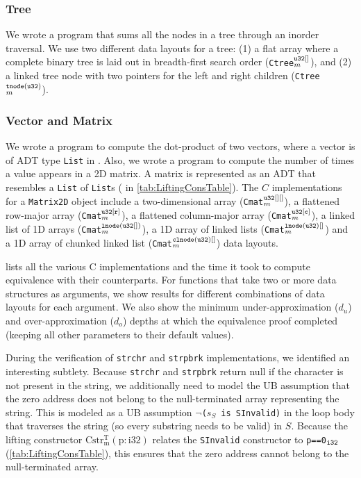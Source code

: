 \subsubsection*{Tree} We wrote a \SpecL{} program that sums all the nodes in a tree
through an inorder traversal. We use two different data layouts for a tree: 
(1) a flat array where a
complete binary tree is laid out in breadth-first search order ({\tt Ctree}$_m^{\tt u32[]}$),
and (2) a linked tree node with two pointers for the left and right children ({\tt Ctree}$_m^{\tt tnode(u32)}$).

\subsubsection*{Vector and Matrix} We wrote a \SpecL{} program to compute the dot-product
of two vectors, where a vector is of ADT type {\tt List} in \SpecL{}. Also, we wrote a
\SpecL{} program to compute the number of times a value appears in a 2D matrix. A
matrix is represented as an ADT that resembles a {\tt List} of {\tt List}s ( in \cref{tab:LiftingConsTable}).
The $C$ implementations for a {\tt Matrix2D} object include
a two-dimensional array ({\tt Cmat}$^{\tt u32[][]}_m$), a flattened row-major array ({\tt Cmat}$^{\tt u32[r]}_m$),
a flattened column-major array ({\tt Cmat}$^{\tt u32[c]}_m$), a linked list of 1D arrays ({\tt Cmat}$^{\tt lnode(u32[])}_m$),
a 1D array of linked lists ({\tt Cmat}$^{\tt lnode(u32)[]}_m$) and a 1D array of chunked linked list ({\tt Cmat}$^{\tt clnode(u32)[]}_m$)
data layouts.


 lists all the various C implementations and the time it took
to compute equivalence with their \SpecL{} counterparts. For functions that
take two or more data structures as arguments, we show
results for different combinations of data layouts for each argument.
We also show the minimum under-approximation ($d_u$) and over-approximation ($d_o$) depths
at which the equivalence proof completed (keeping all other parameters to their
default values).

During the verification of {\tt strchr} and {\tt strpbrk} implementations,
we identified an interesting subtlety. Because {\tt strchr} and {\tt strpbrk}
return null if the character is
not present in the string, we additionally need to model the UB assumption that the zero
address does not belong to the null-terminated array representing the string. This
is modeled as a UB assumption $\neg${\tt ($s_S$ is SInvalid)} in the loop body that traverses the string
(so every substring needs to be valid) in $S$.
Because the lifting constructor
$\mathrm{Cstr^{T}_m(p:i32)}$ relates the {\tt SInvalid} constructor to {\tt p==0$_{\tt i32}$} (\cref{tab:LiftingConsTable}),
this ensures that the zero address cannot belong to the null-terminated array.